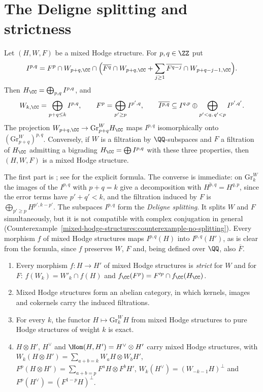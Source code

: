 \section{The Deligne splitting and strictness}\label{mixed-hodge-structures:section-strictness}

\begin{theorem}[Deligne]\label{mixed-hodge-structures:theorem-splitting}
Let $(H, W, F)$ be a mixed Hodge structure. For $p, q \in \ZZ$ put
\[
I^{p,q} = F^p \cap W_{p+q,\CC} \cap \Big(\overline{F^q} \cap W_{p+q,\CC} + \sum_{j \geq 1}\overline{F^{q-j}} \cap W_{p+q-j-1,\CC}\Big).
\]
Then $H_\CC = \bigoplus_{p,q}I^{p,q}$, and
\[
W_{k,\CC} = \bigoplus_{p+q \leq k}I^{p,q}, \qquad F^p = \bigoplus_{p' \geq p}I^{p',q}, \qquad \overline{I^{p,q}} \subseteq I^{q,p} \oplus \bigoplus_{p' < q,\,q' < p}I^{p',q'}.
\]
The projection $W_{p+q,\CC} \to \mathrm{Gr}^W_{p+q}H_\CC$ maps $I^{p,q}$ isomorphically onto $(\mathrm{Gr}^W_{p+q})^{p,q}$. Conversely, if $W$ is a filtration by $\QQ$-subspaces and $F$ a filtration of $H_\CC$
admitting a bigrading $H_\CC = \bigoplus I^{p,q}$ with these three properties, then $(H, W, F)$ is a mixed Hodge structure.
\end{theorem}

The first part is \cite{deligne-hodge-2}; see \cite[Chapter 3]{peters-steenbrink} for the explicit formula. The converse is immediate: on $\mathrm{Gr}^W_k$ the images of the $I^{p,q}$ with $p + q = k$
give a decomposition with $\overline{H^{p,q}} = H^{q,p}$, since the error terms have $p' + q' < k$, and the filtration induced by $F$ is $\bigoplus_{p' \geq p}H^{p',k-p'}$. The subspaces $I^{p,q}$ form
the \emph{Deligne splitting}. It splits $W$ and $F$ simultaneously, but it is not compatible with complex conjugation in general (Counterexample~\ref{mixed-hodge-structures:counterexample-no-splitting}).
Every morphism $f$ of mixed Hodge structures maps $I^{p,q}(H)$ into $I^{p,q}(H')$, as is clear from the formula, since $f$ preserves $W$, $F$ and, being defined over $\QQ$, also $\overline F$.

\begin{theorem}[Deligne]\label{mixed-hodge-structures:theorem-abelian}
\begin{enumerate}
\item Every morphism $f \colon H \to H'$ of mixed Hodge structures is \emph{strict} for $W$ and for $F$: $f(W_k) = W'_k \cap f(H)$ and $f_\CC(F^p) = F'^p \cap f_\CC(H_\CC)$.
\item Mixed Hodge structures form an abelian category, in which kernels, images and cokernels carry the induced filtrations.
\item For every $k$, the functor $H \mapsto \mathrm{Gr}^W_kH$ from mixed Hodge structures to pure Hodge structures of weight $k$ is exact.
\item $H \otimes H'$, $H^\vee$ and $\Hom(H, H') = H^\vee \otimes H'$ carry mixed Hodge structures, with
$W_k(H \otimes H') = \sum_{a+b=k}W_aH \otimes W_bH'$, $F^p(H \otimes H') = \sum_{a+b=p}F^aH \otimes F^bH'$, $W_k(H^\vee) = (W_{-k-1}H)^\perp$ and $F^p(H^\vee) = (F^{1-p}H)^\perp$.
\end{enumerate}
\end{theorem}

